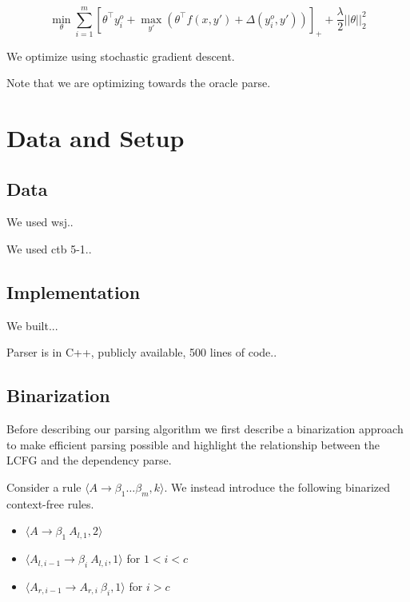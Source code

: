 \documentclass[11pt,letterpaper]{article}
\begin{document}
\[ \min_{\theta} \sum_{i = 1}^m [ \theta^{\top} y^o_i + \max_{y'} ( \theta^{\top} f(x,y')  + \Delta(y^o_i, y') ) ]_{+} + \frac{\lambda}{2} ||\theta||^2_2 \]

We optimize using stochastic gradient descent.
\cite{}

Note that we are optimizing towards the oracle parse.


\section{Data and Setup}


\subsection{Data}

We used wsj..

We used ctb 5-1..




\subsection{Implementation}

We built...

Parser is in C++, publicly available, 500 lines of code..


\subsection{Binarization}

Before describing our parsing algorithm we first describe a binarization approach to make efficient parsing possible and highlight the relationship between the LCFG and the dependency parse.



Consider a rule $\langle A \rightarrow \beta_1 \ldots \beta_m, k\rangle$. We instead introduce the following binarized context-free rules.



\begin{itemize}
\item $\langle A  \rightarrow \beta_1\ A_{l, 1}, 2 \rangle $

\item
$\langle A_{l, i-1}  \rightarrow \beta_i\ A_{l, i}, 1 \rangle $ for $1< i < c$
\item
$\langle A_{r, i-1}  \rightarrow  A_{r, i} \ \beta_i, 1 \rangle $ for $i > c$


\end{itemize}
\end{document}
